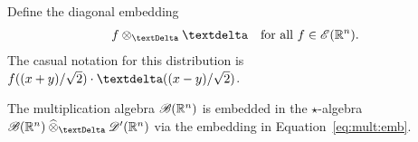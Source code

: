 Define the diagonal embedding
\begin{align}
    f \teproDi \sfdeo
    &&\text{for all $ f \in \fsSmo( \nrR^n ) $.}
    \label{eq:mult:emb}
\end{align}
The casual notation for this distribution
is $ f( (x + y)/\sqrt{2} ) \mult \sfdeo( (x - y)/\sqrt{2} ) $.

\begin{remark}
    The multiplication algebra $ \mathscr{  B  }( \mathbb{ R }^n ) $
    is embedded in the $\star$-algebra $ \fsSmobnd(\nrR^n) \cteproDi \fsDis(\nrR^n) $
    via the embedding in Equation~\eqref{eq:mult:emb}.
\end{remark}